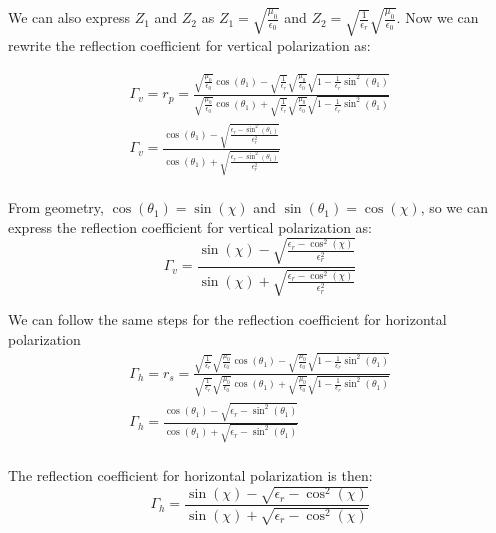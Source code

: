 We can also express $Z_1$ and $Z_2$ as $Z_1 = \sqrt{\frac{\mu_0}{\epsilon_0}}$ and $Z_2 = \sqrt{\frac{1}{\epsilon_r}}\sqrt{\frac{\mu_0}{\epsilon_0}}$. Now we can rewrite the reflection coefficient for vertical polarization as:

\begin{equation}
\begin{gathered}
\label{gd_eq:10}
\Gamma_v = r_p = \frac{\sqrt{\frac{\mu_0}{\epsilon_0}}\cos(\theta_1) - \sqrt{\frac{1}{\epsilon_r}}\sqrt{\frac{\mu_0}{\epsilon_0}}\sqrt{1 - \frac{1}{\epsilon_r}\sin^2(\theta_1)}}{\sqrt{\frac{\mu_0}{\epsilon_0}}\cos(\theta_1) + \sqrt{\frac{1}{\epsilon_r}}\sqrt{\frac{\mu_0}{\epsilon_0}}\sqrt{1 - \frac{1}{\epsilon_r}\sin^2(\theta_1)}} \\
\Gamma_v = \frac{\cos(\theta_1) - \sqrt{ \frac{\epsilon_r - \sin^2(\theta_1) }{\epsilon_r^2} }  } {\cos(\theta_1) + \sqrt{  \frac{\epsilon_r - \sin^2(\theta_1) }{\epsilon_r^2}} } \\
\end{gathered}
\end{equation}
\renewcommand{\baselinestretch}{2} \small\normalsize

From geometry, $\cos(\theta_1) = \sin(\chi)$ and $\sin(\theta_1) = \cos(\chi)$, so we can express the reflection coefficient for vertical polarization as:
\begin{equation}
\label{gd_eq:11}
\boxed{\Gamma_v = \frac{\sin(\chi) - \sqrt{ \frac{\epsilon_r - \cos^2(\chi) }{\epsilon_r^2} }  } {\sin(\chi) + \sqrt{  \frac{\epsilon_r - \cos^2(\chi) }{\epsilon_r^2}} } }
\end{equation}
\renewcommand{\baselinestretch}{2} \small\normalsize

We can follow the same steps for the reflection coefficient for horizontal polarization
\begin{equation}
\begin{gathered}
\label{gd_eq:12}
\Gamma_h = r_s = \frac{\sqrt{\frac{1}{\epsilon_r}}\sqrt{\frac{\mu_0}{\epsilon_0}}\cos(\theta_1) - \sqrt{\frac{\mu_0}{\epsilon_0}}\sqrt{1 - \frac{1}{\epsilon_r}\sin^2(\theta_1)}}{\sqrt{\frac{1}{\epsilon_r}}\sqrt{\frac{\mu_0}{\epsilon_0}}\cos(\theta_1) + \sqrt{\frac{\mu_0}{\epsilon_0}}\sqrt{1 - \frac{1}{\epsilon_r}\sin^2(\theta_1)}} \\
\Gamma_h = \frac{\cos(\theta_1) - \sqrt{\epsilon_r - \sin^2(\theta_1)}}{\cos(\theta_1) + \sqrt{\epsilon_r - \sin^2(\theta_1)}} \\
\end{gathered}
\end{equation}
\renewcommand{\baselinestretch}{2} \small\normalsize

The reflection coefficient for horizontal polarization is then:
\begin{equation}
\label{gd_eq:13}
\boxed{\Gamma_h = \frac{\sin(\chi) - \sqrt{\epsilon_r - \cos^2(\chi)}}{\sin(\chi) + \sqrt{\epsilon_r - \cos^2(\chi)}}}
\end{equation}
\renewcommand{\baselinestretch}{2} \small\normalsize
